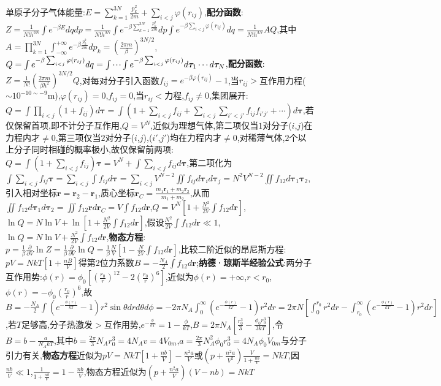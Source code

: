 \documentclass[10pt,a4paper]{article}
\begin{document}
\begin{multicols}{2}
单原子分子气体能量:$E=\sum_{k=1}^{3N}\frac{p_k^2}{2m}+\sum_{i<j}\varphi(r_{ij})$,\textbf{配分函数}:$Z=\frac{1}{N!h^{3N}}\int e^{-\beta E}dqdp=\frac{1}{N!h^{3N}}\int e^{-\beta\sum_{k=1}^{3N}\frac{p_k^2}{2m}}dp\int e^{-\beta\sum_{i<j}\varphi(r_{ij})}dq=\frac{1}{N!h^{3N}}AQ$,其中$A=\prod_{k=1}^{3N}\int_{-\infty}^{+\infty}e^{-\beta\frac{p_k^2}{2m}}dp_k=\left(\frac{2\pi m}{\beta}\right)^{3N/2}$,$Q=\int e^{-\beta\sum_{i<j}\varphi(r_{ij})}dq=\idotsint e^{-\beta\sum_{i<j}\varphi(r_{ij})}d\bm{\tau}_1\cdots d\bm{\tau}_N$,\textbf{配分函数}:$Z=\frac{1}{N!}\left(\frac{2\pi m}{\beta h^2}\right)^{3N/2}Q$,对每对分子引入函数$f_{ij}=e^{-\beta\varphi(r_{ij})}-1$,当$r_{ij}>$互作用力程($\sim10^{-10\sim-9}$m),$\varphi(r_{ij})=0$,$f_{ij}=0$,当$r_{ij}<$力程,$f_{ij}\neq0$,集团展开:$Q=\int\prod_{i<j}(1+f_{ij})d\bm{\tau}=\int(1+\sum_{i<j}f_{ij}+\sum_{i<j}\sum_{i'<j'}f_{ij}f_{i'j'}+\cdots)d\bm{\tau}$,若仅保留首项,即不计分子互作用,$Q=V^N$,近似为理想气体,第二项仅当$1$对分子($i$,$j$)在力程内才$\neq0$,第三项仅当$2$对分子($i$,$j$),($i'$,$j'$)均在力程内才$\neq0$,对稀薄气体,$2$个以上分子同时相碰的概率极小,故仅保留前两项:$Q=\int(1+\sum_{i<j}f_{ij})\bm{\tau}=V^N+\int\sum_{i<j}f_{ij}d\bm{\tau}$,第二项化为$\int\sum_{i<j}f_{ij}\bm{\tau}=\sum_{i<j}\int f_{ij}d\bm{\tau}=\sum_{i<j}V^{N-2}\iint f_{ij}d\bm{\tau}_id\bm{\tau}_j=N^2V^{N-2}\iint f_{12}d\bm{\tau}_1\bm{\tau}_2$,引入相对坐标$\bm{r}=\bm{r}_2-\bm{r}_1$,质心坐标$\bm{r}_C=\frac{m_1\bm{r}_1+m_2\bm{r}_2}{m_1+m_2}$,从而$\iint f_{12}d\bm{\tau}_1d\bm{\tau}_2=\iint f_{12}\bm{r}d\bm{r}_C=V\int f_{12}d\bm{r}$,$Q=V^N\left[1+\frac{N^2}{2V}\int f_{12}d\bm{r}\right]$,$\ln Q=N\ln V+\ln\left[1+\frac{N^2}{2V}\int f_{12}d\bm{r}\right]$,假设$\frac{N^2}{2V}\int f_{12}d\bm{r}\ll1$,$\ln Q=N\ln V+\frac{N^2}{2V}\int f_{12}d\bm{r}$,\textbf{物态方程}:$p=\frac{1}{\beta}\frac{\partial}{\partial V}\ln Z=\frac{1}{\beta}\frac{\partial}{\partial V}\ln Q=\frac{1}{\beta}\frac{N}{V}\left[1-\frac{N}{2V}\int f_{12}d\bm{r}\right]$,比较二阶近似的昂尼斯方程:$pV=NkT\left[1+\frac{nB}{V}\right]$得第$2$位力系数$B=-\frac{N_A}{2}\int f_{12}d\bm{r}$;\textbf{纳德·琼斯半经验公式}:两分子互作用势:$\phi(r)=\phi_0\left[\left(\frac{r_0}{r}\right)^{12}-2\left(\frac{r_0}{r}\right)^6\right]$,近似为$\phi(r)=+\infty$,$r<r_0$,$\phi(r)=-\phi_0\left(\frac{r_0}{r}\right)^6$,故$B=-\frac{N_A}{2}\int(e^{-\frac{\phi(r)}{kT}}-1)r^2\sin\theta drd\theta d\phi=-2\pi N_A\int_0^{\infty}(e^{-\frac{\phi(r)}{kT}}-1)r^2dr=2\pi N\left[\int_0^{r_0}r^2dr-\int_{r_0}^{\infty}(e^{-\frac{\phi(r)}{kT}}-1)r^2dr\right]$,若$T$足够高,分子热激发$>$互作用势,$e^{-\frac{\phi}{kT}}=1-\frac{\phi}{kT}$,$B=2\pi N_A\left[\frac{r_0^3}{3}-\frac{\phi_0r_0^3}{3kT}\right]$,令$B=b-\frac{a}{N_AkT}$,其中$b=\frac{2\pi}{3}N_Ar_0^3=4N_Av=4V_{0m}$,$a=\frac{2\pi}{3}N_A^2\phi_0r_0^3=4N_A\phi_0V_{0m}$与分子引力有关,\textbf{物态方程}近似为$pV=NkT\left[1+\frac{nb}{V}\right]-\frac{n^2a}{V}$或$\left(p+\frac{n^2a}{V^2}\right)\frac{V}{1+\frac{nb}{V}}=NkT$,因$\frac{nb}{V}\ll1$,$\frac{1}{1+\frac{nb}{V}}=1-\frac{nb}{V}$,物态方程近似为$\left(p+\frac{n^2a}{V}\right)(V-nb)=NkT$\\

\end{multicols}
\end{document}
